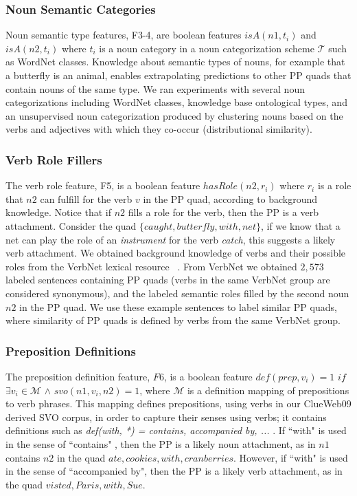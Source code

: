 \subsubsection{Noun Semantic Categories} 

Noun semantic type features, F3-4, are boolean features   $isA(n1,t_i)$ and $isA(n2,t_i)$ where $t_i$ is a noun category in a noun categorization  scheme   $\mathcal{T}$ such as WordNet classes. 
Knowledge about semantic types of nouns, for example  that a butterfly is an animal, enables extrapolating predictions to other PP quads that contain nouns of the same type. %
We ran experiments with several noun categorizations including WordNet classes,  knowledge base ontological types,  and an unsupervised noun categorization produced by clustering  nouns based on the verbs and adjectives with which they co-occur  (distributional similarity).  

\subsubsection{Verb Role Fillers} 
The verb role feature, F5, is a boolean feature $hasRole(n2, r_{i})$ where $r_i$ is a role that  $n2$ can fulfill for the verb  $v$ in the PP quad, according to background knowledge. Notice that  if  $n2$ fills a role for the verb, then the PP is a verb attachment.  Consider the quad $\{caught,butterfly, with, net\}$, if we know that  a net can play the role of an \textit{instrument} for the verb \textit{catch}, this suggests a likely verb attachment.  We obtained background knowledge of verbs and their possible roles  from the VerbNet lexical resource ~\cite{KipperKRP08}. 
From VerbNet we obtained $2,573$ labeled  sentences containing PP quads (verbs in the same VerbNet group are considered synonymous), and the  labeled semantic roles  filled by the second noun $n2$ in the PP quad.  We use these example sentences  to label similar  PP quads, where similarity of PP quads is defined by  verbs from the same VerbNet group. 


\subsubsection{Preposition  Definitions}
The preposition  definition feature, $F6$, is a boolean feature $def(prep,v_i)=1$ $if$ $\exists v_i \in  \mathcal{M}$ $ \wedge$  $svo(n1,v_i,n2)=1$, where $ \mathcal{M}$ is a definition mapping of prepositions to verb phrases.   This mapping defines prepositions, using verbs in our ClueWeb09 derived SVO corpus, in order to capture their senses using verbs; it contains definitions such as \textit{def(with, *) = contains, accompanied by, ... }.   If  ``with" is  used in the  sense of ``contains" , then the PP  is a likely noun attachment, as in $n1$ contains $n2$ in the quad $ate, cookies, with, cranberries$. However, if  ``with" is  used in the sense of  ``accompanied by", then the PP is a likely verb attachment, as in the quad $visted, Paris, with, Sue$.

